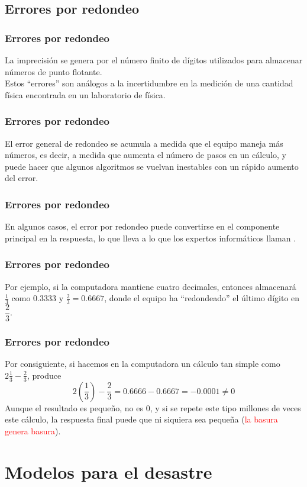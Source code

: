 \subsection{Errores por redondeo}
\begin{frame}
\frametitle{Errores por redondeo}
La imprecisión se genera por el número finito de dígitos utilizados para almacenar números de punto flotante.
\\
\bigskip
Estos \enquote{errores} son análogos a la incertidumbre en la medición de una cantidad física encontrada en un laboratorio de física.
\end{frame}
\begin{frame}
\frametitle{Errores por redondeo}
El error general de redondeo se acumula a medida que el equipo maneja más números, es decir, a medida que aumenta el número de pasos en un cálculo, y puede hacer que algunos algoritmos se vuelvan inestables con un rápido aumento del error.
\end{frame}
\begin{frame}
\frametitle{Errores por redondeo}
En algunos casos, el error por redondeo puede convertirse en el componente principal en la respuesta, lo que lleva a lo que los expertos informáticos llaman .
\end{frame}
\begin{frame}
\frametitle{Errores por redondeo}
Por ejemplo, si la computadora mantiene cuatro decimales, entonces almacenará $\frac{1}{3}$ como $0.3333$ y $\frac{2}{3} = 0.6667$, donde el equipo ha \enquote{redondeado} el último dígito en $\dfrac{2}{3}$.
\end{frame}
\begin{frame}
\frametitle{Errores por redondeo}
Por consiguiente, si hacemos en la computadora un cálculo tan simple como $2 \frac{1}{3} - \frac{2}{3}$, produce
\begin{equation}
2 \left( \dfrac{1}{3} \right) - \dfrac{2}{3} = 0.6666 - 0.6667 = -0.0001 \neq 0
\label{eq:ecuacion_02_03}
\end{equation}
\pause
Aunque el resultado es pequeño, no es $0$, y si se repete este tipo millones de veces este cálculo, la respuesta final puede que ni siquiera sea pequeña (\textcolor{red}{la basura genera basura}).
\end{frame}
\section{Modelos para el desastre}
